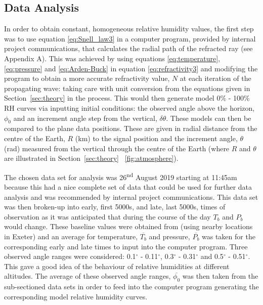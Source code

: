 \documentclass[11pt]{article}
\newcommand{\figref}[2][\figurename~]{#1\ref{#2}}
\newcommand{\secref}[2][Section~]{#1\ref{#2}}
\begin{document}
\subsection{Data Analysis}
\label{ssec:data-analysis}

In order to obtain constant, homogeneous relative humidity values, the first step was to use equation \eqref{eq:Snell_law3} in a computer program, provided by internal project communications, that calculates the radial path of the refracted ray (see Appendix A). This was achieved by using equations \eqref{eq:temperature}, \eqref{eq:pressure} and \eqref{eq:Arden-Buck} in equation \eqref{eq:refractivity3} and modifying the program to obtain a more accurate refractivity value, $N$ at each iteration of the propagating wave: taking care with unit conversion from the equations given in \secref{sec:theory} in the process. This would then generate model 0$\%$ - 100$\%$ RH curves via inputting initial conditions: the observed angle above the horizon, $\phi_0$ and an increment angle step from the vertical, $\delta \theta$. These models can then be compared to the plane data positions. These are given in radial distance from the centre of the Earth, $R$ (km) to the signal position and the increment angle, $\theta$ (rad) measured from the vertical through the centre of the Earth (where $R$ and $\theta$ are illustrated in \secref{sec:theory} \figref{fig:atmosphere}). 

\vspace{2mm}
\noindent
The chosen data set for analysis was 26\textsuperscript{nd} August 2019 starting at 11:45am because this had a nice complete set of data that could be used for further data analysis and was recommended by internal project communications. This data set was then broken-up into early, first 5000s, and late, last 5000s, times of observation as it was anticipated that during the course of the day $T_b$ and $P_b$ would change. These baseline values were obtained from \cite{Web01} (using nearby locations in Exeter) and an average for temperature, $\overline{T_b}$ and pressure, $\overline{P_b}$ was taken for the corresponding early and late times to input into the computer program. Three observed angle ranges were considered: 0.1$^{\circ}$ - 0.11$^{\circ}$, 0.3$^{\circ}$ - 0.31$^{\circ}$ and 0.5$^{\circ}$ - 0.51$^{\circ}$. This gave a good idea of the behaviour of relative humidities at different altitudes. The average of these observed angle ranges, $\overline{\phi_0}$ was then taken from the sub-sectioned data sets in order to feed into the computer program generating the corresponding model relative humidity curves.
\end{document}
